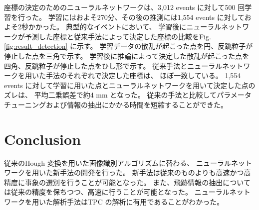 \documentclass{jps-cp}
\begin{document}
座標の決定のためのニューラルネットワークは、3,012 events に対して500 回学習を行った。
学習にはおよそ270分、その後の推測には1,554 events に対しておよそ2秒かかった。
典型的なイベントにおいて、
学習後にニューラルネットワークが予測した座標と従来手法によって決定した座標の比較をFig. \ref{fig:result_detection} に示す。
学習データの散乱が起こった点を円、反跳粒子が停止した点を三角で示す。
学習後に推論によって決定した散乱が起こった点を四角、反跳粒子が停止した点をひし形で示す。
従来手法とニューラルネットワークを用いた手法のそれぞれで決定した座標は、
ほぼ一致している。
1,554 events に対して学習に用いた点とニューラルネットワークを用いて決定した点のズレは、
平均二乗誤差で約4 mm となった。
従来の手法と比較してパラメータチューニングおよび情報の抽出にかかる時間を短縮することができた。


\section{Conclusion}
従来のHough 変換を用いた画像識別アルゴリズムに替わる、
ニューラルネットワークを用いた新手法の開発を行った。
新手法は従来のものよりも高速かつ高精度に事象の選別を行うことが可能となった。
また、飛跡情報の抽出については従来の精度を保ちつつ、高速に行うことが可能となった。
ニューラルネットワークを用いた解析手法はTPC の解析に有用であることがわかった。
\end{document}
